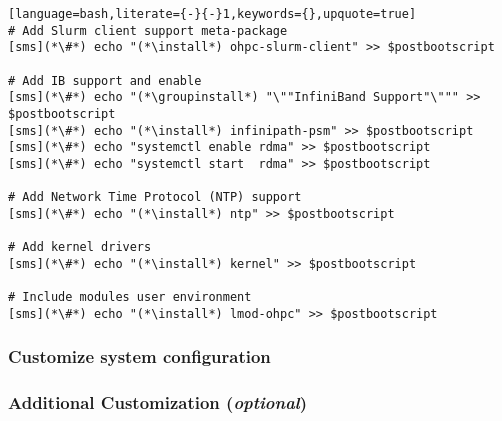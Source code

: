 \documentclass[letterpaper]{article}
\newcommand{\install}{yum -y install}
\newcommand{\groupinstall}{yum -y groupinstall}
\begin{document}
\begin{lstlisting}[language=bash,literate={-}{-}1,keywords={},upquote=true]
# Add Slurm client support meta-package
[sms](*\#*) echo "(*\install*) ohpc-slurm-client" >> $postbootscript

# Add IB support and enable
[sms](*\#*) echo "(*\groupinstall*) "\""InfiniBand Support"\""" >> $postbootscript
[sms](*\#*) echo "(*\install*) infinipath-psm" >> $postbootscript
[sms](*\#*) echo "systemctl enable rdma" >> $postbootscript
[sms](*\#*) echo "systemctl start  rdma" >> $postbootscript

# Add Network Time Protocol (NTP) support
[sms](*\#*) echo "(*\install*) ntp" >> $postbootscript

# Add kernel drivers
[sms](*\#*) echo "(*\install*) kernel" >> $postbootscript

# Include modules user environment
[sms](*\#*) echo "(*\install*) lmod-ohpc" >> $postbootscript
\end{lstlisting}


\subsubsection{Customize system configuration} \label{sec:master_customization}





\subsubsection{Additional Customization ({\em optional})} \label{sec:addl_customizations}

\end{document}
